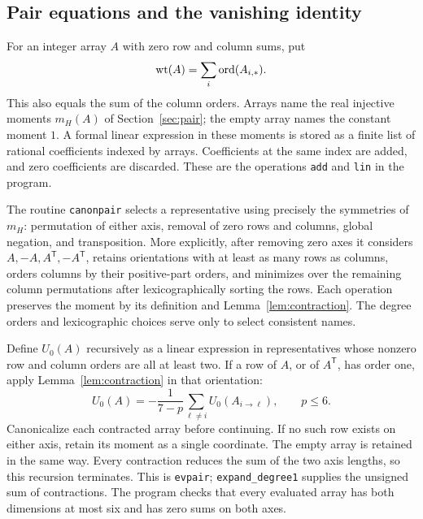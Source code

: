 \subsection{Pair equations and the vanishing identity}

For an integer array $A$ with zero row and column sums, put
\[
 \operatorname{wt}(A)=\sum_i\operatorname{ord}(A_{i,*}).
\]
This also equals the sum of the column orders.  Arrays name the real
injective moments $m_H(A)$ of Section~\ref{sec:pair}; the empty array names
the constant moment $1$.  A formal linear expression in these moments is
stored as a finite list of rational coefficients indexed by arrays.
Coefficients at the same index are added, and zero coefficients are
discarded.  These are the operations \texttt{add} and \texttt{lin} in the
program.

The routine \texttt{canonpair} selects a representative using precisely
the symmetries of $m_H$: permutation of either axis, removal of zero
rows and columns, global negation, and transposition.  More explicitly,
after removing zero axes it considers $A,-A,A^{\mathsf T},-A^{\mathsf T}$,
retains orientations with at least as many rows as columns, orders
columns by their positive-part orders, and minimizes over the remaining
column permutations after lexicographically sorting the rows.  Each
operation preserves the moment by its definition and
Lemma~\ref{lem:contraction}.  The degree orders and lexicographic choices
serve only to select consistent names.

Define $U_0(A)$ recursively as a linear expression in representatives
whose nonzero row and column orders are all at least two.  If a row of
$A$, or of $A^{\mathsf T}$, has order one, apply
Lemma~\ref{lem:contraction} in that orientation:
\begin{equation}
 U_0(A)=-\frac{1}{7-p}\sum_{\ell\ne i}U_0(A_{i\to\ell}),
 \qquad p\le6.
 \label{eq:recursive-pair-reduction}
\end{equation}
Canonicalize each contracted array before continuing.  If no such row
exists on either axis, retain its moment as a single coordinate.  The
empty array is retained in the same way.  Every contraction reduces the
sum of the two axis lengths, so this recursion terminates.  This is
\texttt{evpair}; \texttt{expand\_degree1} supplies the unsigned sum of
contractions.  The program checks that every evaluated array has both
dimensions at most six and has zero sums on both axes.

